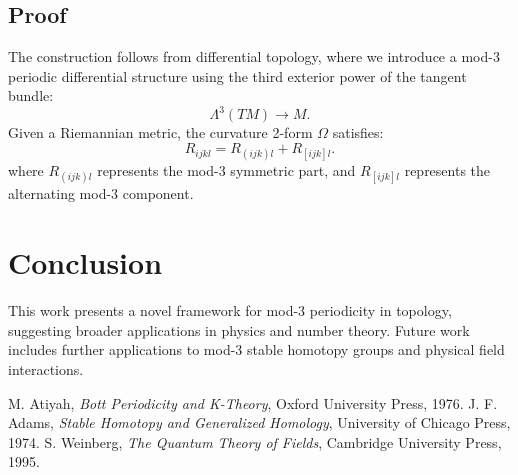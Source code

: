 \documentclass{article}  %
\begin{document}
\subsection{Proof}

The construction follows from differential topology, where we introduce a mod-3 periodic differential structure using the third exterior power of the tangent bundle:
\begin{equation}
\Lambda^3 (TM) \to M.
\end{equation}
Given a Riemannian metric, the curvature 2-form $\Omega$ satisfies:
\begin{equation}
R_{ijkl} = R_{(ijk)l} + R_{[ijk]l}.
\end{equation}
where $R_{(ijk)l}$ represents the mod-3 symmetric part, and $R_{[ijk]l}$ represents the alternating mod-3 component.

\section{Conclusion}
This work presents a novel framework for mod-3 periodicity in topology, suggesting broader applications in physics and number theory. Future work includes further applications to mod-3 stable homotopy groups and physical field interactions.

\begin{thebibliography}{9}
 M. Atiyah, \textit{Bott Periodicity and K-Theory}, Oxford University Press, 1976.
 J. F. Adams, \textit{Stable Homotopy and Generalized Homology}, University of Chicago Press, 1974.
 S. Weinberg, \textit{The Quantum Theory of Fields}, Cambridge University Press, 1995.
\end{thebibliography}
\end{document}
